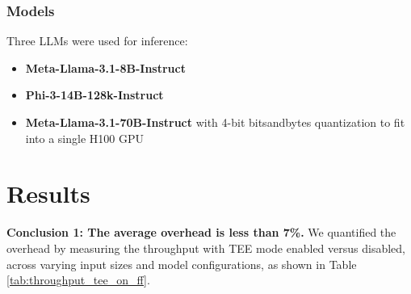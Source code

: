 \documentclass{article}
\begin{document}
\subsubsection{Models}

Three LLMs were used for inference:

\begin{itemize}
    \item \textbf{Meta-Llama-3.1-8B-Instruct}
    \item \textbf{Phi-3-14B-128k-Instruct}
    \item \textbf{Meta-Llama-3.1-70B-Instruct} with 4-bit bitsandbytes quantization to fit into a single H100 GPU
\end{itemize}

\section{Results}

\noindent\textbf{Conclusion 1: The average overhead is less than 7\%.} We quantified the overhead by measuring the throughput with TEE mode enabled versus disabled, across varying input sizes and model configurations, as shown in Table \ref{tab:throughput_tee_on_ff}.
\end{document}
